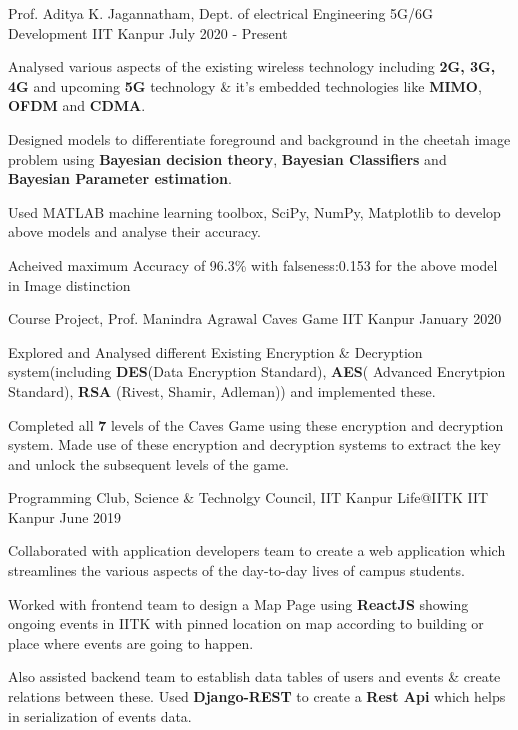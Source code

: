 \begin{cventries}
    
    \cventry
    {Prof. Aditya K. Jagannatham, Dept. of electrical Engineering}
    {5G/6G Development}
    {IIT Kanpur}
    {July 2020 - Present }
    {
      \begin{cvitems}
        \item {Analysed various aspects of the existing wireless technology including \textbf{2G, 3G, 4G} and upcoming \textbf{5G} technology \& it's embedded technologies like \textbf{ MIMO}, \textbf{OFDM} and \textbf{CDMA}.}
        \item {Designed models to differentiate foreground and background in the cheetah image problem using \textbf{Bayesian decision theory},\textbf{ Bayesian Classifiers} and\textbf{ Bayesian Parameter estimation}.}
        \item {Used MATLAB machine learning toolbox, SciPy, NumPy, Matplotlib to develop above models and analyse their accuracy.}
        \item{
        	Acheived maximum Accuracy of 96.3\% with falseness:0.153 for the above model in Image distinction
        }
      \end{cvitems}
    } 
    
    \cventry
    {Course Project, Prof. Manindra Agrawal}
    {Caves Game}
    {IIT Kanpur}
    {January 2020}
    {
      \begin{cvitems}
        \item {Explored and Analysed different Existing  Encryption \& Decryption system(including\textbf{ DES}(Data Encryption Standard), \textbf{AES}( Advanced Encrytpion Standard),\textbf{ RSA} (Rivest, Shamir, Adleman)) and implemented these.}
        \item {Completed all \textbf{7} levels of the Caves Game using  these encryption and decryption system. Made use of these encryption and decryption systems to extract the key and unlock the subsequent levels of the game.}
      \end{cvitems}
    }
    
    \cventry
    {Programming Club, Science \& Technolgy Council, IIT Kanpur}
    {Life@IITK}
    {IIT Kanpur}
    {June 2019}
    {
      \begin{cvitems}
        \item {Collaborated with application developers team to create a web application which streamlines the various aspects of
        the day-to-day lives of campus students.}
        \item {Worked with frontend team to design a Map Page using \textbf{ReactJS} showing ongoing events in IITK with
        	pinned location on map according to building or place where events are going to happen. }
        \item{Also assisted backend team to establish data tables of users and events \& create relations between these. Used \textbf{Django-REST} to create a \textbf{Rest Api} which helps in serialization of events data.  }
      \end{cvitems}
    } 
    

\end{cventries}
